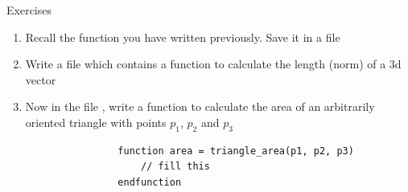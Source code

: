 \begin{frame}[fragile]{Exercises}
    \begin{exercise}
        \begin{enumerate}
            \setitemsep{1em}
            \item Recall the  function you have written previously. Save it in a file 
            \item<2-> Write a file  which contains a function  to calculate the length (norm) of a 3d vector
            \item<3-> Now in the file , write a function to calculate the area of an arbitrarily oriented triangle with points $p_1$, $p_2$ and $p_3$
            \begin{lstlisting}
                function area = triangle_area(p1, p2, p3)
                    // fill this
                endfunction
            \end{lstlisting}
        \end{enumerate}
    \end{exercise}
\end{frame}

